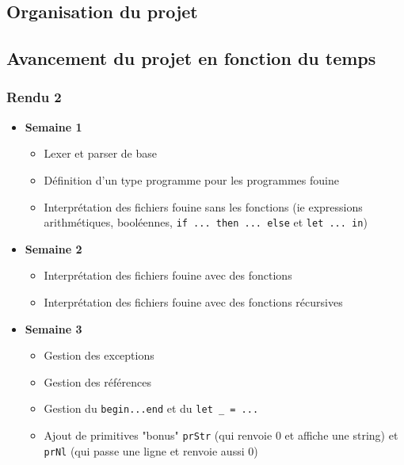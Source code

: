 \subsection{Organisation du projet}



\subsection{Avancement du projet en fonction du temps}
\subsubsection*{Rendu 2}
\begin{itemize}
 \item \textbf{Semaine 1} 
    \begin{itemize}
    \item Lexer et parser de base

    \item Définition d'un type programme pour les programmes fouine

    \item Interprétation des fichiers fouine sans les fonctions
      (ie expressions arithmétiques, booléennes, \texttt{if ... then ... else} et \texttt{let ... in})
    \end{itemize}
    
  \item \textbf{Semaine 2 }
    \begin{itemize}
      \item Interprétation des fichiers fouine avec des fonctions
      \item Interprétation des fichiers fouine avec des fonctions récursives
    \end{itemize}
  
  \item \textbf{ Semaine 3 }
    \begin{itemize}
    \item Gestion des exceptions
    \item Gestion des références
    \item Gestion du \texttt{begin...end} et du \texttt{let \_ = ...}
    \item Ajout de primitives "bonus" \texttt{prStr} (qui renvoie 0 et affiche une string) et \texttt{prNl} (qui passe une ligne et renvoie aussi 0)
    \end{itemize}
\end{itemize}

